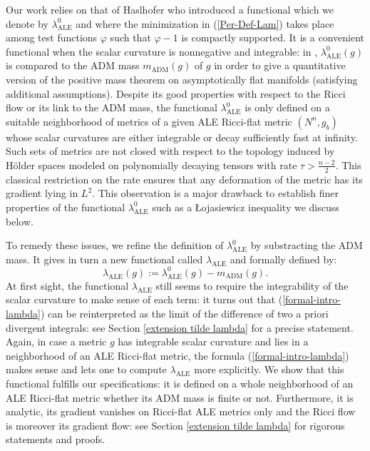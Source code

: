 \documentclass[a4paper,11pt,reqno]{amsart}
\numberwithin{equation}{section}
\begin{document}
	Our work relies on that of Haslhofer \cite{Has-Per-Fct} who introduced a functional which we denote by $\lambda_{\operatorname{ALE}}^0$ and where the minimization in (\ref{Per-Def-Lam}) takes place among test functions $\varphi$ such that $\varphi-1$ is compactly supported. It is a convenient functional when the scalar curvature is nonnegative and integrable: in \cite{Has-Per-Fct}, $\lambda_{\operatorname{ALE}}^0(g)$ is compared to the ADM mass $m_{\operatorname{ADM}}(g)$ of $g$ in order to give a quantitative version of the positive mass theorem on asymptotically flat manifolds (satisfying additional assumptions). 
	Despite its good properties with respect to the Ricci flow or its link to the ADM mass, the functional $\lambda_{\operatorname{ALE}}^0$ is only defined on a suitable neighborhood of metrics of a given ALE Ricci-flat metric $(N^n,g_b)$ whose scalar curvatures are either integrable or decay sufficiently fast at infinity. Such sets of metrics are not closed with respect to the topology induced by H\"older spaces modeled on polynomially decaying tensors with rate $\tau>\frac{n-2}{2}$. This classical restriction on the rate ensures that any deformation of the metric has its gradient lying in $L^2$. This observation is a major drawback to establish finer properties of the functional $\lambda_{\operatorname{ALE}}^0$ such as a \L ojasiewicz inequality we discuss below. 
	
		To remedy these issues, we refine the definition of $\lambda_{\operatorname{ALE}}^0$ by substracting the ADM mass. It gives in turn a new functional called $\lambda_{\operatorname{ALE}}$ and formally defined by:
		\begin{equation}
	\lambda_{\operatorname{ALE}}(g):= \lambda_{\operatorname{ALE}}^0(g)-m_{\operatorname{ADM}}(g).\label{formal-intro-lambda}
	\end{equation}
	At first sight, the functional $\lambda_{\operatorname{ALE}}$ still seems to require the integrability of the scalar curvature to make sense of each term: it turns out that (\ref{formal-intro-lambda}) can be reinterpreted as the limit of the difference of two a priori divergent integrals: see Section \ref{extension tilde lambda} for a precise statement. Again, in case a metric $g$ has integrable scalar curvature and lies in a neighborhood of an ALE Ricci-flat metric, the formula (\ref{formal-intro-lambda}) makes sense and lets one to compute $\lambda_{\operatorname{ALE}}$ more explicitly. We show that this functional fulfills our specifications: it is defined on a whole neighborhood of an ALE Ricci-flat metric whether its ADM mass is finite or not. Furthermore, it is analytic, its gradient vanishes on Ricci-flat ALE metrics only and the Ricci flow is moreover its gradient flow: see Section \ref{extension tilde lambda} for rigorous statements and proofs. 
	
\end{document}

